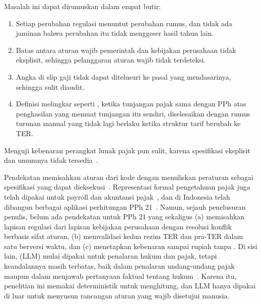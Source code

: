 Masalah ini dapat dirumuskan dalam empat butir:
\begin{enumerate}[leftmargin=*,nosep]
  \item Setiap perubahan regulasi menuntut perubahan rumus, dan tidak ada jaminan bahwa perubahan itu tidak menggeser hasil tahun lain.
  \item Batas antara aturan wajib pemerintah dan kebijakan perusahaan tidak eksplisit, sehingga pelanggaran aturan wajib tidak terdeteksi.
  \item Angka di slip gaji tidak dapat ditelusuri ke pasal yang mendasarinya, sehingga sulit diaudit.
  \item Definisi melingkar seperti , ketika tunjangan pajak sama dengan PPh atas penghasilan yang memuat tunjangan itu sendiri, diselesaikan dengan rumus turunan manual yang tidak lagi berlaku ketika struktur tarif berubah ke TER.
\end{enumerate}
Menguji kebenaran perangkat lunak pajak pun sulit, karena spesifikasi eksplisit dan  umumnya tidak tersedia~\cite{tizpaz2023metamorphic,khiabani2026agentic}.

Pendekatan  memisahkan aturan dari kode dengan menuliskan peraturan sebagai spesifikasi yang dapat dieksekusi~\cite{merigoux2021catala,mowbray2023scaling,kowalski2022logicalenglish}. Representasi formal pengetahuan pajak juga telah dipakai untuk payroll dan akuntansi pajak~\cite{dumancic2021payroll,makowski2025dmn}, dan di Indonesia telah dibangun berbagai aplikasi perhitungan PPh 21~\cite{ramadhani2021grossup,yulistyawati2022payroll,kusuma2026pph21}. Namun, sejauh penelusuran penulis, belum ada pendekatan untuk PPh 21 yang sekaligus (a) memisahkan lapisan regulasi dari lapisan kebijakan perusahaan dengan resolusi konflik berbasis sifat aturan, (b) memvalidasi kedua rezim TER dan pra-TER dalam satu  berversi waktu, dan (c) menetapkan kebenaran sampai rupiah tanpa . Di sisi lain,  (LLM) mulai dipakai untuk penalaran hukum dan pajak, tetapi keandalannya masih terbatas, baik dalam penalaran undang-undang pajak~\cite{blairstanek2023gpt3,nay2024taxattorneys} maupun dalam menjawab pertanyaan faktual tentang hukum~\cite{dahl2024legalfictions}. Karena itu, penelitian ini memakai  deterministik untuk menghitung, dan LLM hanya dipakai di luar  untuk menyusun rancangan aturan yang wajib disetujui manusia.

